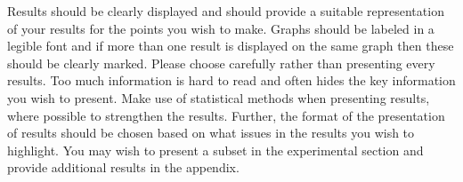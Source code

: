   Results should be clearly displayed and should provide a suitable representation of your results for the points you wish to make. Graphs should be labeled in a legible font and if more than one result is displayed on the same graph then these should be clearly marked.   Please choose carefully rather than presenting every results. Too much information is hard to read and often hides the key information you wish to present. Make use of statistical methods when presenting results, where possible to strengthen the results.  Further, the format of the presentation of results should be chosen based on what issues in the results you wish to highlight. You may wish to present a subset in the experimental section and provide additional results in the appendix.
\fi
